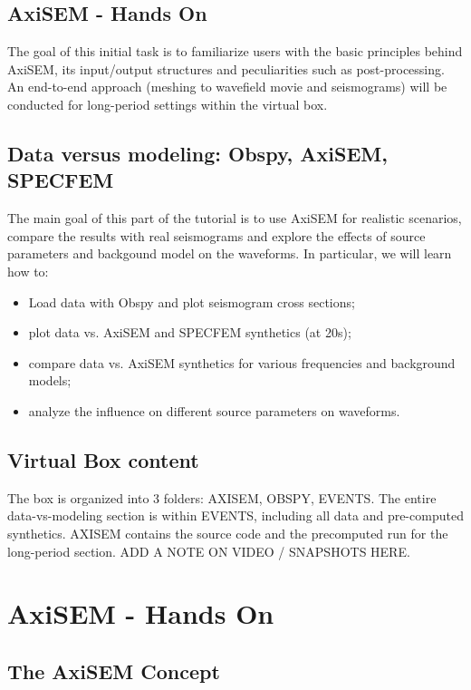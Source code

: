 \documentclass{article}
\begin{document}
\subsection{AxiSEM - Hands On}
The goal of this initial task is to familiarize users with the basic
principles behind AxiSEM, its input/output structures and
peculiarities such as post-processing. An end-to-end approach (meshing to
wavefield movie and seismograms) will be conducted for long-period
settings within the virtual box.
%
\subsection{Data versus modeling: Obspy, AxiSEM, SPECFEM}
The main goal of this part of the tutorial is to use AxiSEM for realistic scenarios, compare the 
results with real seismograms and explore the effects of source parameters and 
backgound model on the waveforms. In particular, we will learn how to:

\begin{itemize}
    \item Load data with Obspy and plot seismogram cross sections;
    \item plot data vs. AxiSEM and SPECFEM synthetics (at 20s);
    \item compare data vs. AxiSEM synthetics for various frequencies and background
          models;
    \item analyze the influence on different source parameters on waveforms.
\end{itemize}


\subsection{Virtual Box content}
The box is organized into 3 folders: AXISEM, OBSPY, EVENTS. The entire
data-vs-modeling section is within EVENTS, including all data and pre-computed
synthetics. AXISEM contains the source code and the precomputed run
for the long-period section. ADD A NOTE ON VIDEO / SNAPSHOTS HERE.


\newpage

\section{AxiSEM - Hands On}

\subsection{The AxiSEM Concept}
\end{document}
